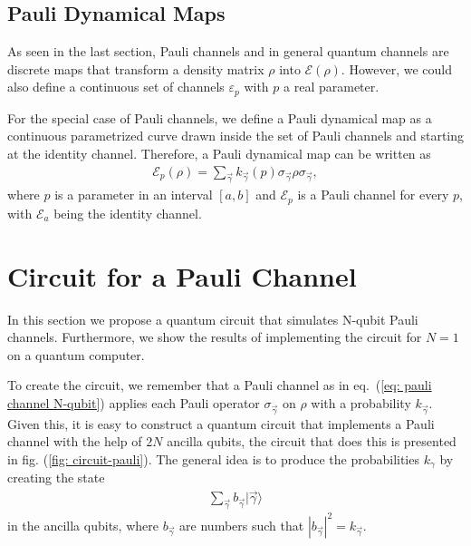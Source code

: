 \documentclass[10pt,letterpaper]{article} %
\begin{document}
\subsection*{Pauli Dynamical Maps} %
\label{subsec: Pauli Dynamical Maps}


As seen in the last section, Pauli channels and in 
general quantum channels are discrete maps
that transform a density matrix $\rho$ into $\mathcal{E}(\rho)$.
However, we could also define a continuous set of 
channels $\varepsilon_p$ with $p$ a real parameter.

For the special case of Pauli channels, we define 
a Pauli dynamical map as a continuous parametrized 
curve drawn inside the set of Pauli channels and starting at the identity channel. 
Therefore, a Pauli dynamical map can be written as
\begin{eqnarray}
\label{eq: Pauli dynamical map}
\mathcal{E}_p(\rho) = \sum_{\vec{\gamma}} k_{\vec{\gamma}}(p) \sigma_{\vec{\gamma}} \rho \sigma_{\vec{\gamma}},
\end{eqnarray}
where $p$ is a parameter in an interval $[a,b]$ 
and $\mathcal{E}_p$ is a Pauli channel for every $p$, 
with $\mathcal{E}_a$ being the identity channel.

\section{Circuit for a Pauli Channel} %
\label{subsec: Circuit for a Pauli Channel}

In this section we propose a quantum circuit that 
simulates N-qubit Pauli channels.
Furthermore, we show the results of implementing the circuit for $N=1$ on
a quantum computer. 

To create the circuit, we remember that a Pauli channel as in eq.~(\ref{eq: pauli channel N-qubit})
applies each Pauli operator $\sigma_{\vec{\gamma}}$ on $\rho$ with a probability $k_{\vec{\gamma}}$.
Given this, it is easy to construct a quantum circuit that implements 
a Pauli channel with the help of $2N$ ancilla qubits,
the circuit that does this is presented in fig. (\ref{fig: circuit-pauli}).
The general idea is to produce the probabilities $k_{\gamma}$ by creating the state
\begin{eqnarray}
\label{eq: state}
\sum_{\vec{\gamma}} b_{\vec{\gamma}} |\vec{\gamma} \rangle
\end{eqnarray}
in the ancilla qubits, 
where $b_{\vec{\gamma}}$ are numbers such that $
|b_{\vec{\gamma}}|^2 = k_{\vec{\gamma}}.$
\end{document}
